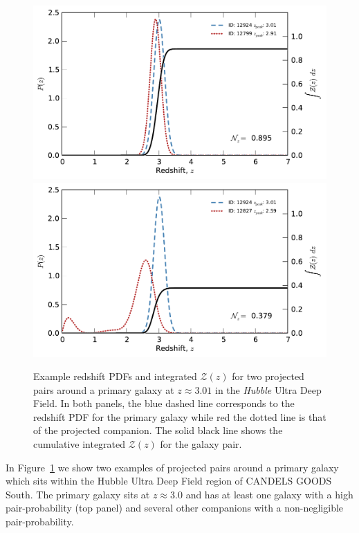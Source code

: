 \begin{figure}
\includegraphics[width=\columnwidth]{plots/PairsPz_pri_81_2.pdf}
\includegraphics[width=\columnwidth]{plots/PairsPz_pri_81_4.pdf}
  
  \caption[Example redshift PDFs and integrated $\mathcal{Z}(z)$ for two projected pairs around a primary galaxy at $z\approx 3.01$ in the \emph{Hubble} Ultra Deep Field.]{Example redshift PDFs and integrated $\mathcal{Z}(z)$ for two projected pairs around a primary galaxy at $z\approx 3.01$ in the \emph{Hubble} Ultra Deep Field. In both panels, the blue dashed line corresponds to the redshift PDF for the primary galaxy while red the dotted line is that of the projected companion. The solid black line shows the cumulative integrated $\mathcal{Z}(z)$ for the galaxy pair.}
  \label{fig:pairs_pz}
\end{figure}

In Figure~\ref{fig:pairs_pz} we show two examples of projected pairs around a primary galaxy which sits within the Hubble Ultra Deep Field region of CANDELS GOODS South. The primary galaxy sits at $z\approx 3.0$ and has at least one galaxy with a high pair-probability (top panel) and several other companions with a non-negligible pair-probability.

